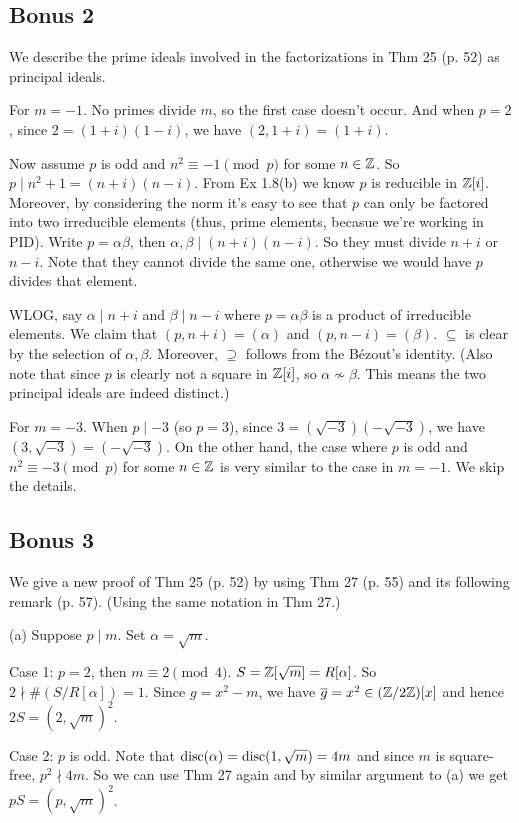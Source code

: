\documentclass[../Marcus.tex]{subfiles}
\begin{document}
\subsection*{Bonus 2}

We describe the prime ideals involved in the factorizations in Thm 25 (p. 52) as principal ideals.

For $m=-1$. No primes divide $m$, so the first case doesn't occur. And when $p=2$, since $2=(1+i)(1-i)$, we have $(2,1+i)=(1+i)$.

Now assume $p$ is odd and $n^2\equiv -1 \pmod{p}$ for some $n\in\mathbb{Z}$. So $p\mid n^2+1=(n+i)(n-i)$. From Ex 1.8(b) we know $p$ is reducible in $\mathbb{Z}[i]$. Moreover, by considering the norm it's easy to see that $p$ can only be factored into two irreducible elements (thus, prime elements, becasue we're working in PID). Write $p=\alpha\beta$, then $\alpha,\beta\mid(n+i)(n-i)$. So they must divide $n+i$ or $n-i$. Note that they cannot divide the same one, otherwise we would have $p$ divides that element.

WLOG, say $\alpha\mid n+i$ and $\beta\mid n-i$ where $p=\alpha\beta$ is a product of irreducible elements. We claim that $(p,n+i)=(\alpha)$ and $(p,n-i)=(\beta)$. $\subseteq$ is clear by the selection of $\alpha,\beta$. Moreover, $\supseteq$ follows from the Bézout's identity. (Also note that since $p$ is clearly not a square in $\mathbb{Z}[i]$, so $\alpha\nsim\beta$. This means the two principal ideals are indeed distinct.)

For $m=-3$. When $p\mid -3$ (so $p=3$), since $3=(\sqrt{-3})(-\sqrt{-3})$, we have $(3,\sqrt{-3})=(-\sqrt{-3})$. On the other hand, the case where $p$ is odd and $n^2\equiv -3 \pmod{p}$ for some $n\in\mathbb{Z}$ is very similar to the case in $m=-1$. We skip the details.

\subsection*{Bonus 3}

We give a new proof of Thm 25 (p. 52) by using Thm 27 (p. 55) and its following remark (p. 57). (Using the same notation in Thm 27.)

(a) Suppose $p\mid m$. Set $\alpha=\sqrt{m}$. 

Case 1: $p=2$, then $m\equiv 2 \pmod{4}$. $S=\mathbb{Z}[\sqrt{m}]=R[\alpha]$. So $2\nmid \#(S/R[\alpha])=1$. Since $g=x^2-m$, we have $\overline{g}=x^2\in(\mathbb{Z}/2\mathbb{Z})[x]$ and hence $2S=(2,\sqrt{m})^2$.

Case 2: $p$ is odd. Note that $\operatorname{disc}(\alpha)=\operatorname{disc}(1,\sqrt{m})=4m$ and since $m$ is square-free, $p^2\nmid 4m$. So we can use Thm 27 again and by similar argument to (a) we get $pS=(p,\sqrt{m})^2$.
\end{document}
